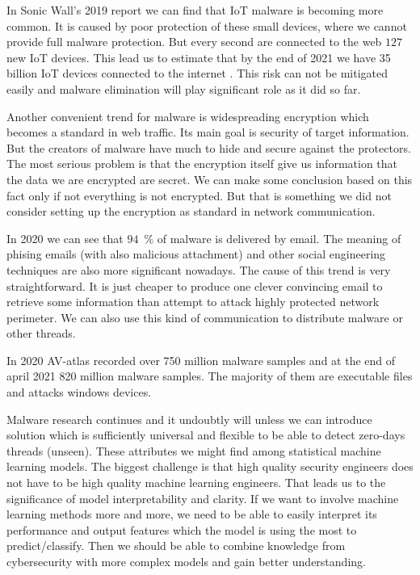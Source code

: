 In Sonic Wall's 2019 report we can find that IoT malware is becoming more common. It is caused by poor protection of these small devices, where we cannot provide full malware protection. But every second are connected to the web $127$ new IoT devices. This lead us to estimate that by the end of 2021 we have 35 billion IoT devices connected to the internet \cite{TheIoTRu52:online}. This risk can not be mitigated easily and malware elimination will play significant role as it did so far.

Another convenient trend for malware is widespreading encryption which becomes a standard in web traffic. Its main goal is security of target information. But the creators of malware have much to hide and secure against the protectors. The most serious problem is that the encryption itself give us information that the data we are encrypted are secret. We can make some conclusion based on this fact only if not everything is not encrypted. But that is something we did not consider setting up the encryption as standard in network communication.

In 2020 \cite{Topcyber13:online} we can see that $94$~\% of malware is delivered by email. The meaning of phising emails (with also malicious attachment) and other social engineering techniques are also more significant nowadays. The cause of this trend is very straightforward. It is just cheaper to produce one clever convincing email to retrieve some information than attempt to attack highly protected network perimeter. We can also use this kind of communication to distribute malware or other threads.

In 2020 AV-atlas \cite{AVATLASM39:online} recorded over 750 million malware samples and at the end of april 2021 820 million malware samples. The majority of them are executable files and attacks windows devices.

Malware research continues and it undoubtly will unless we can introduce solution which is sufficiently universal and flexible to be able to detect zero-days threads (unseen). These attributes we might find among statistical machine learning models. The biggest challenge is that high quality security engineers does not have to be high quality machine learning engineers. That leads us to the significance of model interpretability and clarity. If we want to involve machine learning methods more and more, we need to be able to easily interpret its performance and output features which the model is using the most to predict/classify. Then we should be able to combine knowledge from cybersecurity with more complex models and gain better understanding. 


